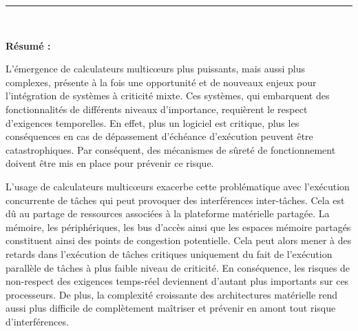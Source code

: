 \documentclass[french, a4paper, 11pt, twoside, pdftex]{StyleThese}
\begin{document}
\cmnt
{ %
	\begin{bibunit}
		\renewcommand{\bibsection}{\large \textbf{\begin{center}
					Publications
		\end{center}}}
		\makeatletter
		\renewcommand\@biblabel[1]{}
		\makeatother
		\def\bibfont{\small}
		
		\nocite{*}
		\putbib[MyPublications]
	\end{bibunit}
}

\cleardoublepage


\begin{vcenterpage}
\noindent\rule[2pt]{\textwidth}{0.5pt}
\\ %
	{\large\textbf{Résumé :} 
		
		L'émergence de calculateurs multicœurs plus puissants, mais aussi plus complexes, présente à la fois une opportunité et de nouveaux enjeux pour l'intégration de systèmes à criticité mixte. Ces systèmes, qui embarquent des fonctionnalités de différents niveaux d'importance, requièrent le respect d'exigences temporelles. En effet, plus un logiciel est critique, plus les conséquences en cas de dépassement d'échéance d'exécution peuvent être catastrophiques. Par conséquent, des mécanismes de sûreté de fonctionnement doivent être mis en place pour prévenir ce risque. 
		
		L'usage de calculateurs multicœurs exacerbe cette problématique avec l'exécution concurrente de tâches qui peut provoquer des interférences inter-tâches. Cela est dû au partage de ressources associées à la plateforme matérielle partagée. La mémoire, les périphériques, les bus d'accès ainsi que les espaces mémoire partagés constituent ainsi des points de congestion potentielle. Cela peut alors mener à des retards dans l'exécution de tâches critiques uniquement du fait de l'exécution parallèle de tâches à plus faible niveau de criticité. En conséquence, les risques de non-respect des exigences temps-réel deviennent d'autant plus importants sur ces processeurs. De plus, la complexité croissante des architectures matérielle rend aussi plus difficile de complètement maîtriser et prévenir en amont tout risque d'interférences.
		
}
\end{vcenterpage}
\end{document}
